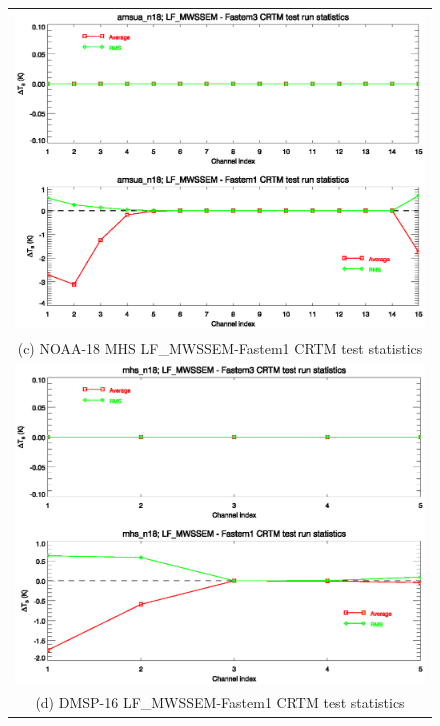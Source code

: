 \begin{figure}[htp]
\begin{tabular}{c}
    \includegraphics[bb=85 225 540 380,clip,scale=0.8]{graphics/Comparison/amsua_n18.TBstats.eps}\\
    \textsf{(c) NOAA-18 MHS LF\_MWSSEM-Fastem1 CRTM test statistics}\\
    \includegraphics[bb=85 225 540 380,clip,scale=0.8]{graphics/Comparison/mhs_n18.TBstats.eps}\\
    \textsf{(d) DMSP-16 LF\_MWSSEM-Fastem1 CRTM test statistics}\\

\end{tabular}
\end{figure}
